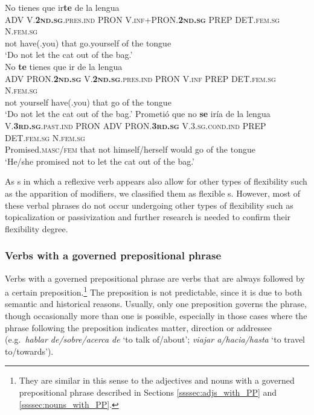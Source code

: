 \documentclass[output=paper]{langsci/langscibook}
\begin{document}
\begin{exe}
\ex 
	\begin{xlist}
    \ex \label{ex:lenguaA}
	\glll No tienes que ir\textbf{te} de la lengua\\
	\textsc{ADV} \textsc{V.\textbf{2nd.sg}.pres.ind} \textsc{PRON} \textsc{V.inf+{PRON}.\textbf{2nd.sg}} \footnotesize{PREP} \textsc{DET.fem.sg} \textsc{N.fem.sg} \\
    not {have(.you)} that go.yourself of the tongue\\
	\glt `Do not let the cat out of the bag.' \\
	\ex \label{ex:lenguaB}
	\glll No \textbf{te} tienes que ir de la lengua\\
	\textsc{ADV} \textsc{PRON.\textbf{2nd.sg}} \textsc{V.\textbf{2nd.sg}.pres.ind} \textsc{PRON} \textsc{V.inf} \textsc{PREP} \textsc{DET.fem.sg} \textsc{N.fem.sg} \\
    not yourself {have(.you)} that go of the tongue\\
	\glt `Do not let the cat out of the bag.'
    \ex \label{ex:lenguaC}
	\glll Prometió que no \textbf{se} iría de la lengua\\
	\textsc{V.\textbf{3rd.sg}.past.ind} \textsc{PRON} \textsc{ADV} \textsc{PRON.\textbf{3rd.sg}} \textsc{V.3.sg.cond.ind} \textsc{PREP} \textsc{DET.fem.sg} \textsc{N.fem.sg} \\
    {Promised.\textsc{masc/fem}} that not {himself/herself} {would go} of the tongue\\
	\glt `He/she promised not to let the cat out of the bag.'
	\end{xlist}
\end{exe}

As \mwe s in which a reflexive verb appears also allow for other types of flexibility such as the apparition of modifiers, we classified them as flexible \mwe s.
However, most of these verbal phrases do not occur undergoing other types of flexibility such as topicalization or passivization and further research is needed to confirm their flexibility degree.

\subsubsection{Verbs with a governed prepositional phrase}
\label{sssec:governedPPs}

Verbs with a governed prepositional phrase are verbs that are always followed by a certain preposition.\footnote{They are similar in this sense to the adjectives and nouns with a governed prepositional phrase described in Sections \ref{ssssec:adjs_with_PP} and \ref{ssssec:nouns_with_PP}.}
The preposition is not predictable, since it is due to both semantic and historical reasons. 
Usually, only one preposition governs the phrase, though occasionally more than one is possible, especially in those cases where the phrase following the preposition indicates matter, direction or addressee (e.g.\ \textit{hablar de/sobre/acerca de} `to talk of/about'; \textit{viajar a/hacia/hasta} `to travel to/towards').
\end{document}
